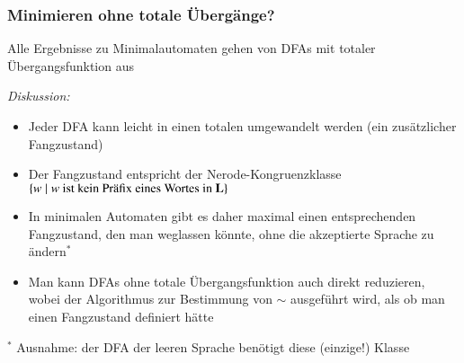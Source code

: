 \documentclass[aspectratio=1610,onlymath]{beamer}
\begin{document}
\begin{frame}\frametitle{Minimieren ohne totale Übergänge?}

Alle Ergebnisse zu Minimalautomaten gehen von DFAs mit \alert{totaler} Übergangsfunktion aus
\medskip

\emph{Diskussion:}
\begin{itemize}
\item Jeder DFA kann leicht in einen totalen umgewandelt werden (ein zusätzlicher Fangzustand)
\item Der Fangzustand entspricht der Nerode-Kongruenzklasse $\{w\mid w\text{ ist kein Präfix eines Wortes in }\textbf{\textcolor{black}{L}}\}$
\item In minimalen Automaten gibt es daher maximal einen entsprechenden Fangzustand, den man weglassen könnte, ohne die akzeptierte Sprache zu ändern${}^*$
\item Man kann DFAs ohne totale Übergangsfunktion auch direkt reduzieren, wobei der Algorithmus zur Bestimmung von $\sim$ ausgeführt wird, als ob man einen Fangzustand definiert hätte
\end{itemize}
{\tiny ${}^*$ Ausnahme: der DFA der leeren Sprache benötigt diese (einzige!) Klasse}

\end{frame}
\end{document}

